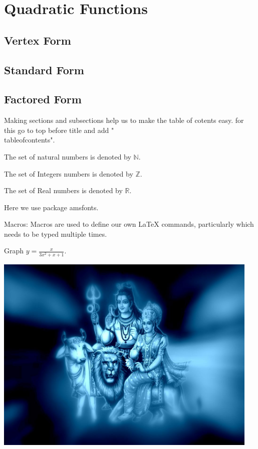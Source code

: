 \documentclass[11pt]{article}
\def\eq1{y = \frac{x}{3x^2+x+1}}
\begin{document}
\section{Quadratic Functions}
	\subsection{Vertex Form}
	\subsection{Standard Form}
	\subsection{Factored Form}
	
Making sections and subsections help us to make the table of cotents easy. for this go to top before title and add "\\tableofcontents".

The set of natural numbers is denoted by $\mathbb{N}$.

The set of Integers numbers is denoted by $\mathbb{Z}$.

The set of Real numbers is denoted by $\mathbb{R}$.

Here we use package amsfonts.

Macros:
Macros are used to define our own LaTeX commands, particularly which needs to be typed multiple times.

Graph $\eq1$.

\includegraphics[width = 5in]{last.jpg}
\end{document}
